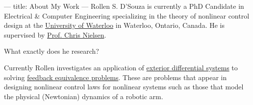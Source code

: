 ---
title: About My Work
---
Rollen S. D'Souza is currently a PhD Candidate in Electrical \& Computer Engineering specializing in the theory of nonlinear control design at the \href{https://uwaterloo.ca/}{University of Waterloo} in Waterloo, Ontario, Canada.
He is supervised by \href{https://ece.uwaterloo.ca/~cnielsen/}{Prof. Chris Nielsen}.

What exactly does he research?

Currently Rollen investigates an application of \href{https://en.wikipedia.org/wiki/Differential_ideal}{exterior differential systems} to solving \href{https://en.wikipedia.org/wiki/Feedback_linearization}{feedback equivalence problems}.
These are problems that appear in designing nonlinear control laws for nonlinear systems such as those that model the physical (Newtonian) dynamics of a robotic arm.
